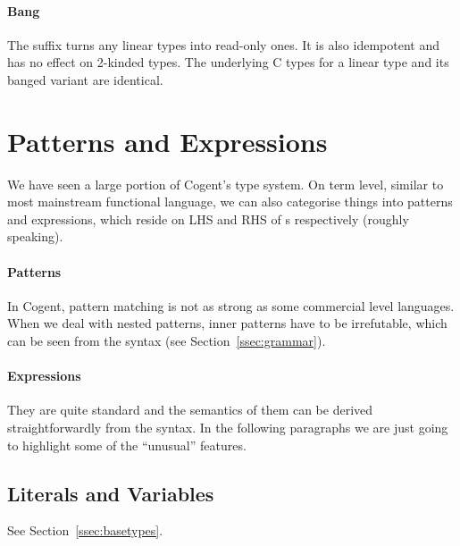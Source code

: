 \documentclass[a4paper]{article}
\newcommand{\cogent}{Cogent\xspace}
\begin{document}
\paragraph{Bang} The \code{!} suffix turns any linear types into read-only ones.
It is also idempotent and has no effect on 2-kinded types. The underlying C types
for a linear type and its banged variant are identical.

\section{Patterns and Expressions}
We have seen a large portion of \cogent's type system. On term level, similar to most mainstream functional language,
we can also categorise things into patterns and expressions, which reside on LHS and RHS of \code{=}s respectively (roughly speaking).

\paragraph{Patterns} In \cogent, pattern matching is not as strong as some commercial level languages. When we deal with nested patterns,
inner patterns have to be irrefutable, which can be seen from the syntax (see Section~\ref{ssec:grammar}).

\paragraph{Expressions} They are quite standard and the semantics of them can be derived straightforwardly from the syntax. In the following
paragraphs we are just going to highlight some of the ``unusual'' features.

\subsection{Literals and Variables}
See Section~\ref{ssec:basetypes}.
\end{document}
